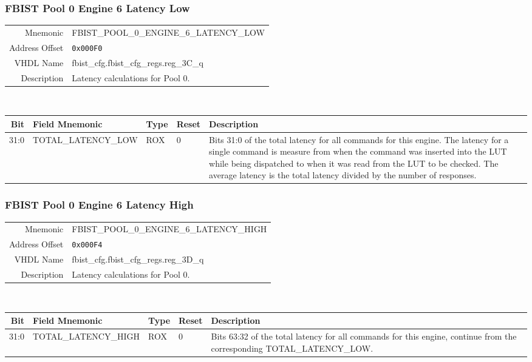 \subsubsection{FBIST Pool 0 Engine 6 Latency Low}
\begin{tabular}{ r | p{350px} }
  Mnemonic       & FBIST\_POOL\_0\_ENGINE\_6\_LATENCY\_LOW \\
  Address Offset & \texttt{0x000F0}                        \\
  VHDL Name      &  fbist\_cfg.fbist\_cfg\_regs.reg\_3C\_q \\ \hline

  Description &
  Latency calculations for Pool 0. \\
\end{tabular}
\\
\begin{tabularx}{\textwidth}{r|l|l|l|X}
  \hline
  Bit   & Field Mnemonic      & Type & Reset & Description \\ \hline

  31:0  & TOTAL\_LATENCY\_LOW & ROX  & 0     &

  Bits 31:0 of the total latency for all commands for this engine. The
  latency for a single command is measure from when the command was
  inserted into the LUT while being dispatched to when it was read
  from the LUT to be checked. The average latency is the total latency
  divided by the number of responses. \\
\end{tabularx}

\subsubsection{FBIST Pool 0 Engine 6 Latency High}
\begin{tabular}{ r | p{350px} }
  Mnemonic       & FBIST\_POOL\_0\_ENGINE\_6\_LATENCY\_HIGH \\
  Address Offset & \texttt{0x000F4}                         \\
  VHDL Name      &  fbist\_cfg.fbist\_cfg\_regs.reg\_3D\_q  \\ \hline

  Description &
  Latency calculations for Pool 0. \\
\end{tabular}
\\
\begin{tabularx}{\textwidth}{r|l|l|l|X}
  \hline
  Bit   & Field Mnemonic       & Type & Reset & Description \\ \hline

  31:0  & TOTAL\_LATENCY\_HIGH & ROX  & 0     &

  Bits 63:32 of the total latency for all commands for this engine,
  continue from the corresponding TOTAL\_LATENCY\_LOW. \\
\end{tabularx}

